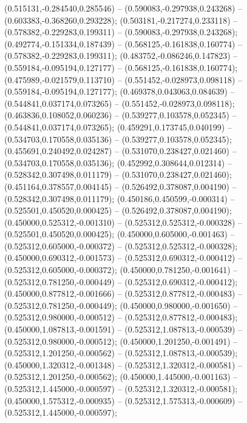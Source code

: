  (0.515131,-0.284540,0.285546) -- (0.590083,-0.297938,0.243268) -- (0.603383,-0.368260,0.293228);
 (0.503181,-0.217274,0.233118) -- (0.578382,-0.229283,0.199311) -- (0.590083,-0.297938,0.243268);
 (0.492774,-0.151334,0.187439) -- (0.568125,-0.161838,0.160774) -- (0.578382,-0.229283,0.199311);
 (0.483752,-0.086246,0.147823) -- (0.559184,-0.095194,0.127177) -- (0.568125,-0.161838,0.160774);
 (0.475989,-0.021579,0.113710) -- (0.551452,-0.028973,0.098118) -- (0.559184,-0.095194,0.127177);
 (0.469378,0.043063,0.084639) -- (0.544841,0.037174,0.073265) -- (0.551452,-0.028973,0.098118);
 (0.463836,0.108052,0.060236) -- (0.539277,0.103578,0.052345) -- (0.544841,0.037174,0.073265);
 (0.459291,0.173745,0.040199) -- (0.534703,0.170558,0.035136) -- (0.539277,0.103578,0.052345);
 (0.455691,0.240492,0.024287) -- (0.531070,0.238427,0.021460) -- (0.534703,0.170558,0.035136);
 (0.452992,0.308644,0.012314) -- (0.528342,0.307498,0.011179) -- (0.531070,0.238427,0.021460);
 (0.451164,0.378557,0.004145) -- (0.526492,0.378087,0.004190) -- (0.528342,0.307498,0.011179);
 (0.450186,0.450599,-0.000314) -- (0.525501,0.450520,0.000425) -- (0.526492,0.378087,0.004190);
 (0.450000,0.525312,-0.001310) -- (0.525312,0.525312,-0.000328) -- (0.525501,0.450520,0.000425);
 (0.450000,0.605000,-0.001463) -- (0.525312,0.605000,-0.000372) -- (0.525312,0.525312,-0.000328);
 (0.450000,0.690312,-0.001573) -- (0.525312,0.690312,-0.000412) -- (0.525312,0.605000,-0.000372);
 (0.450000,0.781250,-0.001641) -- (0.525312,0.781250,-0.000449) -- (0.525312,0.690312,-0.000412);
 (0.450000,0.877812,-0.001666) -- (0.525312,0.877812,-0.000483) -- (0.525312,0.781250,-0.000449);
 (0.450000,0.980000,-0.001650) -- (0.525312,0.980000,-0.000512) -- (0.525312,0.877812,-0.000483);
 (0.450000,1.087813,-0.001591) -- (0.525312,1.087813,-0.000539) -- (0.525312,0.980000,-0.000512);
 (0.450000,1.201250,-0.001491) -- (0.525312,1.201250,-0.000562) -- (0.525312,1.087813,-0.000539);
 (0.450000,1.320312,-0.001348) -- (0.525312,1.320312,-0.000581) -- (0.525312,1.201250,-0.000562);
 (0.450000,1.445000,-0.001163) -- (0.525312,1.445000,-0.000597) -- (0.525312,1.320312,-0.000581);
 (0.450000,1.575312,-0.000935) -- (0.525312,1.575313,-0.000609) -- (0.525312,1.445000,-0.000597);
